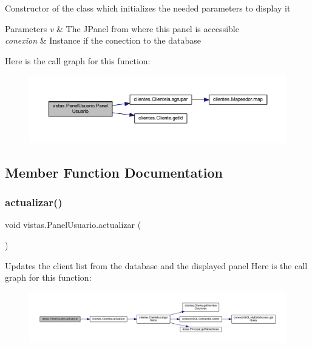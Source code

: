 Constructor of the class which initializes the needed parameters to display it 
\begin{DoxyParams}{Parameters}
{\em v} & The J\+Panel from where this panel is accessible \\
\hline
{\em conexion} & Instance if the conection to the database \\
\hline
\end{DoxyParams}
Here is the call graph for this function\+:
\nopagebreak
\begin{figure}[H]
\begin{center}
\leavevmode
\includegraphics[width=350pt]{classvistas_1_1_panel_usuario_a21281d964400efa712d8d87864cf4d10_cgraph}
\end{center}
\end{figure}


\subsection{Member Function Documentation}
\mbox{\label{classvistas_1_1_panel_usuario_aa9aeb86ba4863b50f1c32ff55ce38932}} 
\subsubsection{\texorpdfstring{actualizar()}{actualizar()}}
{\footnotesize\ttfamily void vistas.\+Panel\+Usuario.\+actualizar (\begin{DoxyParamCaption}{ }\end{DoxyParamCaption})}

Updates the client list from the database and the displayed panel Here is the call graph for this function\+:
\nopagebreak
\begin{figure}[H]
\begin{center}
\leavevmode
\includegraphics[width=350pt]{classvistas_1_1_panel_usuario_aa9aeb86ba4863b50f1c32ff55ce38932_cgraph}
\end{center}
\end{figure}
\mbox{\label{classvistas_1_1_panel_usuario_a5cea3757537523a738660ae7bbb41030}} 
